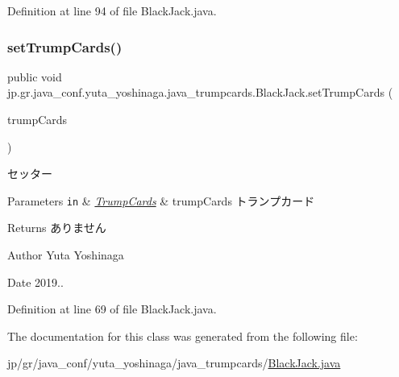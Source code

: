 Definition at line 94 of file Black\+Jack.\+java.

\mbox{\label{classjp_1_1gr_1_1java__conf_1_1yuta__yoshinaga_1_1java__trumpcards_1_1_black_jack_a216185ef3f8c02439b201ec52234aecf}} 
\subsubsection{\texorpdfstring{set\+Trump\+Cards()}{setTrumpCards()}}
{\footnotesize\ttfamily public void jp.\+gr.\+java\+\_\+conf.\+yuta\+\_\+yoshinaga.\+java\+\_\+trumpcards.\+Black\+Jack.\+set\+Trump\+Cards (\begin{DoxyParamCaption}\item[{\hyperlink{classjp_1_1gr_1_1java__conf_1_1yuta__yoshinaga_1_1java__trumpcards_1_1_trump_cards}{Trump\+Cards}}]{trump\+Cards }\end{DoxyParamCaption})}



セッター 


\begin{DoxyParams}[1]{Parameters}
\mbox{\tt in}  & {\em \hyperlink{classjp_1_1gr_1_1java__conf_1_1yuta__yoshinaga_1_1java__trumpcards_1_1_trump_cards}{Trump\+Cards}} & trump\+Cards トランプカード \\
\hline
\end{DoxyParams}
\begin{DoxyReturn}{Returns}
ありません 
\end{DoxyReturn}
\begin{DoxyAuthor}{Author}
Yuta Yoshinaga 
\end{DoxyAuthor}
\begin{DoxyDate}{Date}
2019.. 
\end{DoxyDate}


Definition at line 69 of file Black\+Jack.\+java.



The documentation for this class was generated from the following file\+:\begin{DoxyCompactItemize}
\item 
jp/gr/java\+\_\+conf/yuta\+\_\+yoshinaga/java\+\_\+trumpcards/\hyperlink{_black_jack_8java}{Black\+Jack.\+java}\end{DoxyCompactItemize}
